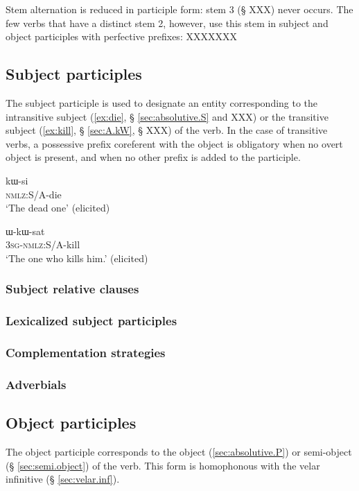 Stem alternation is reduced in participle form: stem 3 (§ XXX) never occurs. The few verbs that have a distinct stem 2, however, use this stem in subject and object participles with perfective prefixes: XXXXXXX

\subsection{Subject participles}
The subject participle is used to designate an entity corresponding to the intransitive subject (\ref{ex:die}, § \ref{sec:absolutive.S} and XXX) or the transitive subject (\ref{ex:kill}, § \ref{sec:A.kW}, § XXX) of the verb. In the case of transitive verbs, a possessive prefix coreferent with the object is obligatory when no overt object is present, and when no other prefix is added to the participle.

 \begin{exe}
\ex \label{ex:die}
\gll kɯ-si    \\
  \textsc{nmlz}:S/A-die \\
 \glt  `The dead one' (elicited)
\end{exe}

 \begin{exe} 
\ex \label{ex:kill}
\gll ɯ-kɯ-sat    \\
  \textsc{3sg}-\textsc{nmlz}:S/A-kill \\
 \glt  `The one who kills him.' (elicited)
\end{exe}

\subsubsection{Subject relative clauses}

\subsubsection{Lexicalized subject participles}

\subsubsection{Complementation strategies}

\subsubsection{Adverbials}

\subsection{Object participles}
The object participle corresponds to the object (\ref{sec:absolutive.P}) or semi-object (§ \ref{sec:semi.object}) of the verb. This form is homophonous with the velar infinitive (§ \ref{sec:velar.inf}).

